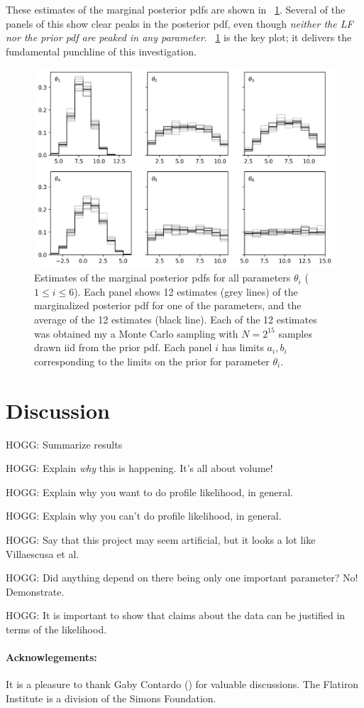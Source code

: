 \documentclass[10pt]{article}
\newcommand{\figref}[1]{\figurename~\ref{#1}}
\begin{document}
These estimates of the marginal posterior pdfs are shown in \figref{fig:Experiment1}.
Several of the panels of this \figurename{} show clear peaks in the posterior pdf, even though \emph{neither the LF nor the prior pdf are peaked in any parameter}.
\figref{fig:Experiment1} is the key plot; it delivers the fundamental punchline of this investigation.
\begin{figure}[t!]
\includegraphics[width=\textwidth]{./notebooks/Experiment1.png}
\caption{Estimates of the marginal posterior pdfs for all parameters $\theta_i$ ($1\leq i\leq 6$). Each panel shows 12 estimates (grey lines) of the marginalized posterior pdf for one of the parameters, and the average of the 12 estimates (black line). Each of the 12 estimates was obtained my a Monte Carlo sampling with $N=2^15$ samples drawn iid from the prior pdf. Each panel $i$ has limits $a_i, b_i$ corresponding to the limits on the prior for parameter $\theta_i$.\label{fig:Experiment1}}
\end{figure}

\section{Discussion}

HOGG: Summarize results

HOGG: Explain \emph{why} this is happening. It's all about volume!

HOGG: Explain why you want to do profile likelihood, in general.

HOGG: Explain why you can't do profile likelihood, in general.

HOGG: Say that this project may seem artificial, but it looks a lot like Villaescusa et al.

HOGG: Did anything depend on there being only one important parameter? No! Demonstrate.

HOGG: It is important to show that claims about the data can be justified in terms of the likelihood.

\paragraph{Acknowlegements:}
It is a pleasure to thank
  Gaby Contardo ()
for valuable discussions.
The Flatiron Institute is a division of the Simons Foundation.

\end{document}
